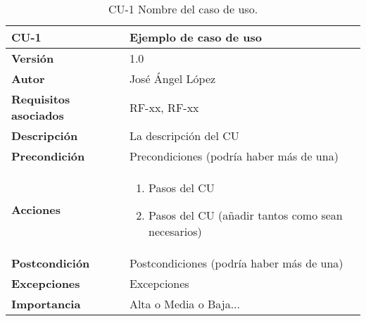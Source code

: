 \begin{table}[p]
	\centering
	\begin{tabularx}{\linewidth}{ p{} p{} }
		\toprule
		\textbf{CU-1}    & \textbf{Ejemplo de caso de uso}\\
		\toprule
		\textbf{Versión}              & 1.0    \\
		\textbf{Autor}                & José Ángel López \\
		\textbf{Requisitos asociados} & RF-xx, RF-xx \\
		\textbf{Descripción}          & La descripción del CU \\
		\textbf{Precondición}         & Precondiciones (podría haber más de una) \\
		\textbf{Acciones}             &
		\begin{enumerate}
			\def\labelenumi{\arabic{enumi}.}
			\tightlist
			\item Pasos del CU
			\item Pasos del CU (añadir tantos como sean necesarios)
		\end{enumerate}\\
		\textbf{Postcondición}        & Postcondiciones (podría haber más de una) \\
		\textbf{Excepciones}          & Excepciones \\
		\textbf{Importancia}          & Alta o Media o Baja... \\
		\bottomrule
	\end{tabularx}
	\caption{CU-1 Nombre del caso de uso.}
\end{table}